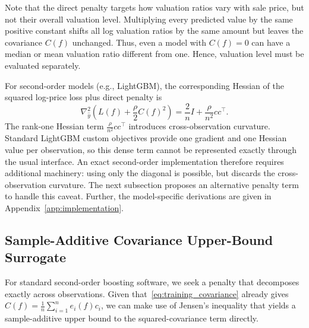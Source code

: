 \documentclass[10pt]{article}
\theoremstyle{definition}
\newcommand{\1}{\mathbf{1}}
\begin{document}
Note that the direct penalty targets how valuation ratios vary with sale price, but not their
overall valuation level. Multiplying every predicted value by the same positive constant shifts all log valuation ratios by the same amount but leaves the covariance $C(f)$ unchanged. Thus, even a model with $C(f)=0$ can have a median or mean valuation ratio different from one. Hence, valuation level must be evaluated separately.


{For second-order models (e.g., LightGBM), the corresponding Hessian of the squared log-price loss plus direct penalty is}
{
\begin{equation}
\label{eq:direct_gradient_hessian}
\nabla_{\widehat y}^2
\left(
L(f)+\frac{\rho}{2}C(f)^2
\right)
=
\frac{2}{n}I+\frac{\rho}{n^2}cc^\top.
\end{equation}
}
The rank-one Hessian term $\frac{\rho}{n^{2}}cc^\top$ introduces cross-observation curvature. Standard LightGBM custom objectives provide one gradient and one Hessian value per observation, so this dense term cannot be represented exactly through the usual interface. An exact second-order implementation therefore requires additional machinery: using only the diagonal is possible, but discards the cross-observation curvature. The next subsection proposes an alternative penalty term to handle this caveat. Further, the model-specific derivations are given in Appendix~\ref{app:implementation}.


\subsection{{Sample-Additive Covariance Upper-Bound Surrogate}}
\label{subsec:surrogate}


{For standard second-order boosting software, we seek a penalty that decomposes exactly across observations. Given that~\eqref{eq:training_covariance} already gives $C(f)=\frac{1}{n}\sum_{i=1}^n e_i(f)c_i$, we can make use of Jensen's inequality that yields a sample-additive upper bound to the squared-covariance term directly.}
\end{document}
